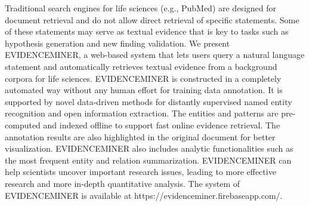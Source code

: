 Traditional search engines for life sciences (e.g., PubMed) are designed for document retrieval and do not allow direct retrieval of specific statements. Some of these statements may serve as textual evidence that is key to tasks such as hypothesis generation and new finding validation. We present EVIDENCEMINER, a web-based system that lets users query a natural language statement and automatically retrieves textual evidence from a background corpora for life sciences. EVIDENCEMINER is constructed in a completely automated way without any human effort for training data annotation. It is supported by novel data-driven methods for distantly supervised named entity recognition and open information extraction. The entities and patterns are pre-computed and indexed offline to support fast online evidence retrieval. The annotation results are also highlighted in the original document for better visualization. EVIDENCEMINER also includes analytic functionalities such as the most frequent entity and relation summarization. EVIDENCEMINER can help scientists uncover important research issues, leading to more effective research and more in-depth quantitative analysis. The system of EVIDENCEMINER is available at https://evidenceminer.firebaseapp.com/.

